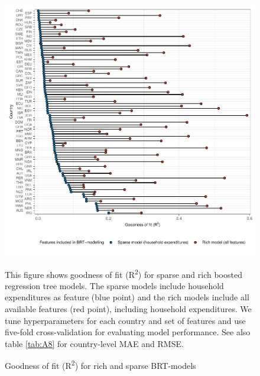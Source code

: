 \documentclass[12pt, a4paper]{article}
\newenvironment{subcaption2}
{\strut
\vspace{-5pt}
\begin{minipage}[b]{0.95\textwidth}
  \hspace*{-\parindent}
  \footnotesize}
 {\end{minipage}}
\begin{document}
\begin{refsection}
\begin{figure}[ht!]
    \centering
    \includegraphics[width=\textwidth]{1_Figures/Figures_Appendix/Figure_Comparison_Models.pdf}
    \caption{Goodness of fit (R\textsuperscript{2}) for rich and sparse BRT-models}\label{fig:comparison}
    \label{fig:comparison_models}
    \begin{subcaption2}
    This figure shows goodness of fit (R\textsuperscript{2}) for sparse and rich boosted regression tree models. The sparse models include household expenditures as feature (blue point) and the rich models include all available features (red point), including household expenditures. We tune hyperparameters for each country and set of features and use five-fold cross-validation for evaluating model performance. See also table \ref{tab:A8} for country-level MAE and RMSE.
    \end{subcaption2}
\end{figure}

\clearpage


\clearpage



\clearpage



\end{refsection}
\end{document}
